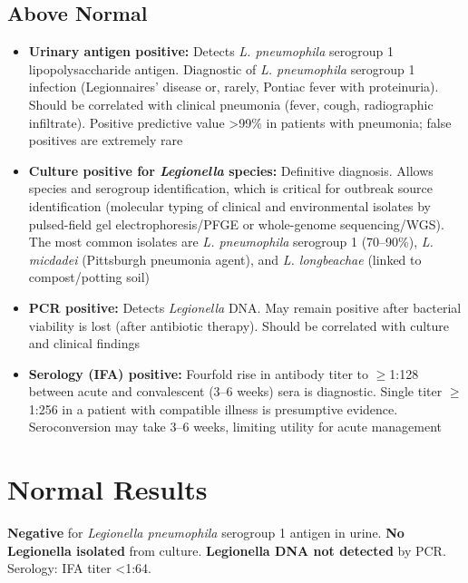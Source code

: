 \subsection*{Above Normal}
\begin{itemize}
  \item \textbf{Urinary antigen positive:} Detects \textit{L. pneumophila} serogroup 1 lipopolysaccharide antigen. Diagnostic of \textit{L. pneumophila} serogroup 1 infection (Legionnaires' disease or, rarely, Pontiac fever with proteinuria). Should be correlated with clinical pneumonia (fever, cough, radiographic infiltrate). Positive predictive value >99\% in patients with pneumonia; false positives are extremely rare
  \item \textbf{Culture positive for \textit{Legionella} species:} Definitive diagnosis. Allows species and serogroup identification, which is critical for outbreak source identification (molecular typing of clinical and environmental isolates by pulsed-field gel electrophoresis/PFGE or whole-genome sequencing/WGS). The most common isolates are \textit{L. pneumophila} serogroup 1 (70--90\%), \textit{L. micdadei} (Pittsburgh pneumonia agent), and \textit{L. longbeachae} (linked to compost/potting soil)
  \item \textbf{PCR positive:} Detects \textit{Legionella} DNA. May remain positive after bacterial viability is lost (after antibiotic therapy). Should be correlated with culture and clinical findings
  \item \textbf{Serology (IFA) positive:} Fourfold rise in antibody titer to $\geq$1:128 between acute and convalescent (3--6 weeks) sera is diagnostic. Single titer $\geq$1:256 in a patient with compatible illness is presumptive evidence. Seroconversion may take 3--6 weeks, limiting utility for acute management
\end{itemize}

\section*{Normal Results}
\textbf{Negative} for \textit{Legionella pneumophila} serogroup 1 antigen in urine. \textbf{No Legionella isolated} from culture. \textbf{Legionella DNA not detected} by PCR. Serology: IFA titer <1:64.

